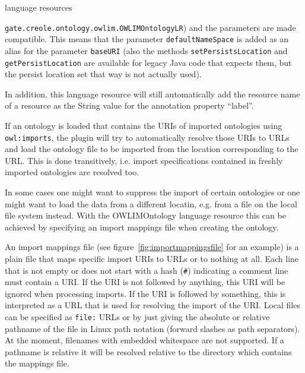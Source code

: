 language resources {\texttt{gate.creole.ontology.owlim.OWLIMOntologyLR}) and
the parameters are made compatible. This means that the parameter
\texttt{defaultNameSpace} is added as an alias for the parameter
\texttt{baseURI} (also the methods \texttt{setPersistsLocation} and 
\texttt{getPersistLocation} are available for legacy Java code that expects
them, but the persist location set that way is not actually used).

In addition, this language resource will still automatically add the resource
name of a resource as the String value for the annotation property ``label''.


If an ontology is loaded that contains the URIs of imported ontologies
using \texttt{owl:imports}, the plugin will try to automatically resolve
those URIs to URLs and load the ontology file to be imported from the location
corresponding to the URL. 
This is done transitively, i.e. import specifications contained in freshly
imported ontologies are resolved too.

In some cases one might want to suppress the import of certain ontologies or
one might want to load the data from a different locatin, e.g. from a file
on the local file system instead. With the OWLIMOntology language resource
this can be achieved by specifying an import mappings file when creating 
the ontology.

An import mappings file (see figure~\ref{fig:importmappingsfile} for an example)
is a plain file that maps specific import URIs to 
URLs or to nothing at all. Each line that is not empty or does not start 
with a hash (\verb|#|) indicating a comment line must contain a URI.
If the URI is not followed by anything, this URI will be ignored when 
processing imports. If the URI is followed by something, this is interpreted
as a URL that is used for resolving the import of the URI. Local files
can be specified as \texttt{file:} URLs or by just giving the absolute
or relative pathname of the file in Linux path notation (forward slashes
as path separators). At the moment, filenames with embedded whitespace
are not supported. If a pathname is relative it will be resolved relative
to the directory which contains the mappings file.

\begin{figure}[htbp]
\begin{center}
{\footnotesize
\begin{small}\begin{verbatim}


\end{verbatim}
\end{small}}
\end{center}
\end{figure}}
